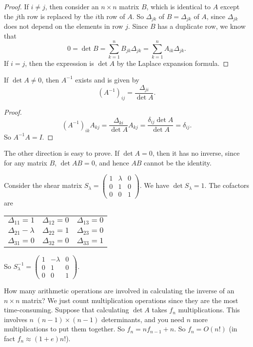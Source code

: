 \documentclass[a4paper]{article}
\begin{document}
\begin{proof}
  If $i \not= j$, then consider an $n\times n$ matrix $B$, which is identical to $A$ except the $j$th row is replaced by the $i$th row of $A$. So $\Delta_{jk}$ of $B = \Delta_{jk}$ of $A$, since $\Delta_{jk}$ does not depend on the elements in row $j$. Since $B$ has a duplicate row, we know that
  \[
    0 = \det B = \sum_{k = 1}^n B_{jk}\Delta_{jk} = \sum_{k = 1}^n A_{ik}\Delta_{jk}.
  \]
  If $i = j$, then the expression is $\det A$ by the Laplace expansion formula.
\end{proof}

\begin{thm}
  If $\det A \not =0$, then $A^{-1}$ exists and is given by
  \[
    (A^{-1})_{ij} = \frac{\Delta_{ji}}{\det A}.
  \]
\end{thm}

\begin{proof}
  \[
    (A^{-1})_{ik}A_{kj} = \frac{\Delta_{ki}}{\det A} A_{kj} = \frac{\delta_{ij}\det A}{\det A} = \delta_{ij}.
  \]
  So $A^{-1}A = I$.
\end{proof}
The other direction is easy to prove. If $\det A = 0$, then it has no inverse, since for any matrix $B$, $\det AB = 0$, and hence $AB$ cannot be the identity.

\begin{eg}
  Consider the shear matrix $S_\lambda = \begin{pmatrix} 1 & \lambda & 0 \\ 0 & 1 & 0\\ 0 & 0 & 1\end{pmatrix}$. We have $\det{S_\lambda} = 1$. The cofactors are
  \begin{center}
    \begin{tabular}{ccc}
      $\Delta_{11} = 1$ & $\Delta_{12} = 0$ & $\Delta_{13} = 0$ \\
      $\Delta_{21} - \lambda$ & $\Delta_{22} = 1$ & $\Delta_{23} = 0$ \\
      $\Delta_{31} = 0$ & $\Delta_{32} = 0$ & $\Delta_{33} = 1$
    \end{tabular}
  \end{center}
  So $S_\lambda^{-1} = \begin{pmatrix} 1 & -\lambda & 0\\ 0 & 1 & 0\\ 0 & 0 & 1\end{pmatrix}$.
\end{eg}

How many arithmetic operations are involved in calculating the inverse of an $n\times n$ matrix? We just count multiplication operations since they are the most time-consuming. Suppose that calculating $\det A$ takes $f_n$ multiplications. This involves $n$ $(n - 1)\times (n - 1)$ determinants, and you need $n$ more multiplications to put them together. So $f_n = nf_{n -1} + n$. So $f_n = O(n!)$ (in fact $f_n \approx (1 + e)n!$).
\end{document}
